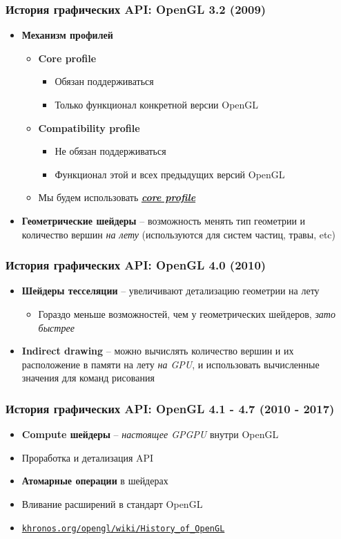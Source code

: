 \documentclass[10pt]{beamer}
\begin{document}
\begin{frame}
\frametitle{История графических API: OpenGL 3.2 (2009)}
\begin{itemize}
\item \textbf{Механизм профилей}
\begin{itemize}
\item \textbf{Core profile}
\begin{itemize}
\item Обязан поддерживаться
\item Только функционал конкретной версии OpenGL
\end{itemize}
\item \textbf{Compatibility profile}
\begin{itemize}
\item Не обязан поддерживаться
\item Функционал этой и всех предыдущих версий OpenGL
\end{itemize}
\pause
\item Мы будем использовать \alert{\textbf{\textit{\underline{core profile}}}}
\end{itemize}
\pause
\item \textbf{Геометрические шейдеры} -- возможность менять тип геометрии и количество вершин \textit{на лету} (используются для систем частиц, травы, etc)
\end{itemize}
\end{frame}

\begin{frame}
\frametitle{История графических API: OpenGL 4.0 (2010)}
\begin{itemize}
\item \textbf{Шейдеры тесселяции} -- увеличивают детализацию геометрии на лету
\begin{itemize}
\item Гораздо меньше возможностей, чем у геометрических шейдеров, \textit{зато быстрее}
\end{itemize}
\pause
\item \textbf{Indirect drawing} -- можно вычислять количество вершин и их расположение в памяти на лету \textit{на GPU}, и использовать вычисленные значения для команд рисования
\end{itemize}
\end{frame}

\begin{frame}
\frametitle{История графических API: OpenGL 4.1 - 4.7 (2010 - 2017)}
\begin{itemize}
\item \textbf{Compute шейдеры} -- \textit{настоящее GPGPU} внутри OpenGL
\item Проработка и детализация API
\item \textbf{Атомарные операции} в шейдерах
\item Вливание расширений в стандарт OpenGL
\item \href{https://khronos.org/opengl/wiki/History_of_OpenGL}{\nolinkurl{khronos.org/opengl/wiki/History\_of\_OpenGL}}
\end{itemize}
\end{frame}
\end{document}
